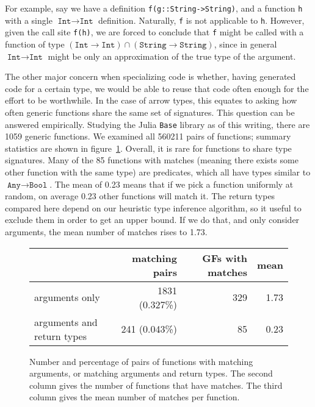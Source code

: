 For example, say we have a definition \texttt{f(g::String->String)},
and a function \texttt{h} with a single $\texttt{Int}\rightarrow\texttt{Int}$ definition.
Naturally, \texttt{f} is not applicable to \texttt{h}.
However, given the call site \texttt{f(h)}, we are forced to conclude
that \texttt{f} might be called with a function of type
\mbox{$(\texttt{Int}\rightarrow\texttt{Int})\cap(\texttt{String}\rightarrow\texttt{String})$},
since in general $\texttt{Int}\rightarrow\texttt{Int}$ might be only an
approximation of the true type of the argument.


The other major concern when specializing code is whether, having generated code
for a certain type, we would be able to reuse that code often enough for the
effort to be worthwhile.
In the case of arrow types, this equates to asking how often generic functions
share the same set of signatures.
This question can be answered empirically.
Studying the Julia \texttt{Base} library as of this writing, there are 1059
generic functions. We examined all 560211 pairs of functions; summary
statistics are shown in figure~\ref{fig:matchingfuncs}.
Overall, it is rare for functions to share type signatures.
Many of the 85 functions with matches (meaning there exists some other function
with the same type) are predicates, which all have types similar to
$\texttt{Any}\rightarrow \texttt{Bool}$. The mean of 0.23 means that if we
pick a function uniformly at random, on average 0.23 other functions will
match it.
The return types compared here depend on our heuristic type inference algorithm,
so it useful to exclude them in order to get an upper bound.
If we do that, and only consider arguments, the mean number of matches rises to 1.73.

\begin{figure}
  \begin{center}
    \begin{tabular}{|l|r|r|r|}\hline
    &  \textbf{matching pairs} & \textbf{GFs with matches} & \textbf{mean} \\
      \hline \hline
arguments only             & 1831 (0.327\%)  &   329       &          1.73 \\
\hline
arguments and return types &  241 (0.043\%)  &   85        &          0.23 \\
\hline
\end{tabular}
\end{center}
  \caption{
    Number and percentage of pairs of functions with matching arguments, or
    matching arguments and return types. The second column gives the number of
    functions that have matches. The third column gives the
    mean number of matches per function.
  }
  \label{fig:matchingfuncs}
\end{figure}


